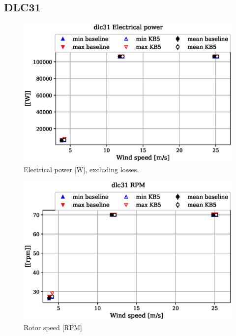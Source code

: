 
\subsection{DLC31}
\label{sec:baseline-vs-KB6:dlc31}

\begin{figure}[!ht]
\begin{center}
	\includegraphics[width=.85\linewidth]{figures/baseline-vs-KB6/dlc31/DLL-generator_servo-inpvec-2_AA0007_AA0003.eps}
\end{center}
\caption{Electrical power [W], excluding losses.}
\label{fig:baseline-vs-KB6:dlc31:power}
\end{figure}

\begin{figure}[!ht]
\begin{center}
	\includegraphics[width=.85\linewidth]{figures/baseline-vs-KB6/dlc31/bearing-shaft_rot-angle_speed-rpm_AA0007_AA0003.eps}
\end{center}
\caption{Rotor speed [RPM]}
\label{fig:baseline-vs-KB6:dlc31:rpm}
\end{figure}


